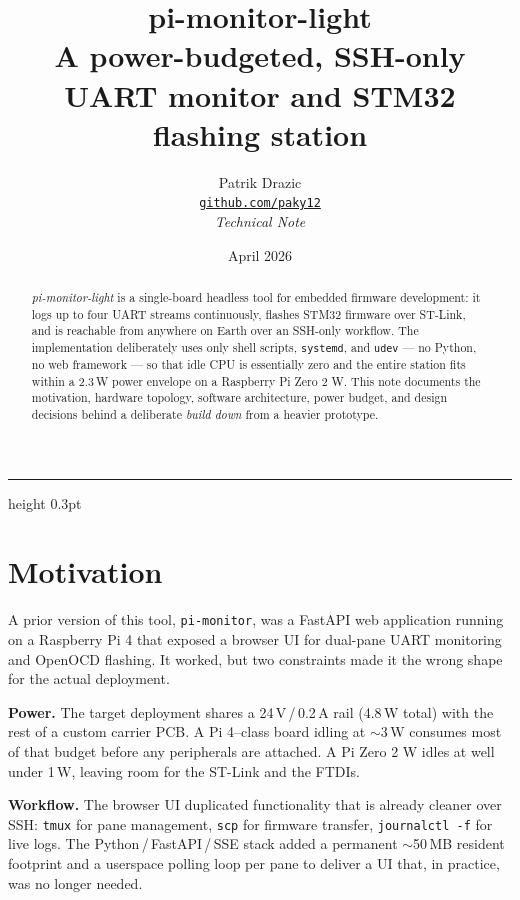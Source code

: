 \documentclass[11pt,a4paper]{article}
\title{\vspace{-1.4cm}
  {\sffamily\bfseries\color{accent}\Large pi-monitor-light}\\[2pt]
  {\sffamily\large A power-budgeted, SSH-only UART monitor and STM32 flashing station}}
\author{\sffamily\normalsize Patrik Drazic\\[1pt]
        \small\href{https://github.com/paky12}{\nolinkurl{github.com/paky12}}\\[2pt]
        \small\textit{Technical Note}}
\date{\sffamily\small April 2026}
\begin{document}
\maketitle
\thispagestyle{fancy}

\begin{abstract}\noindent\small
\textit{pi-monitor-light} is a single-board headless tool for embedded
firmware development: it logs up to four UART streams continuously,
flashes STM32 firmware over ST-Link, and is reachable from anywhere
on Earth over an SSH-only workflow. The implementation deliberately
uses only shell scripts, \texttt{systemd}, and \texttt{udev} --- no
Python, no web framework --- so that idle CPU is essentially zero and
the entire station fits within a 2.3\,W power envelope on a Raspberry
Pi Zero 2 W. This note documents the motivation, hardware topology,
software architecture, power budget, and design decisions behind a
deliberate \emph{build down} from a heavier prototype.
\end{abstract}

{\small
\setcounter{tocdepth}{1}
\renewcommand{\contentsname}{\sffamily\normalsize\color{accent}Contents}
\tableofcontents
}

\vspace{6pt}\hrule height 0.3pt\vspace{6pt}

\section{Motivation}

A prior version of this tool, \texttt{pi-monitor}, was a FastAPI web
application running on a Raspberry Pi 4 that exposed a browser UI for
dual-pane UART monitoring and OpenOCD flashing. It worked, but two
constraints made it the wrong shape for the actual deployment.

\textbf{Power.} The target deployment shares a 24\,V\,/\,0.2\,A rail
(4.8\,W total) with the rest of a custom carrier PCB. A Pi 4--class
board idling at $\sim$3\,W consumes most of that budget before any
peripherals are attached. A Pi Zero 2 W idles at well under 1\,W,
leaving room for the ST-Link and the FTDIs.

\textbf{Workflow.} The browser UI duplicated functionality that is
already cleaner over SSH: \texttt{tmux} for pane management,
\texttt{scp} for firmware transfer, \texttt{journalctl -f} for live
logs. The Python\,/\,FastAPI\,/\,SSE stack added a permanent $\sim$50\,MB
resident footprint and a userspace polling loop per pane to deliver a
UI that, in practice, was no longer needed.
\end{document}
